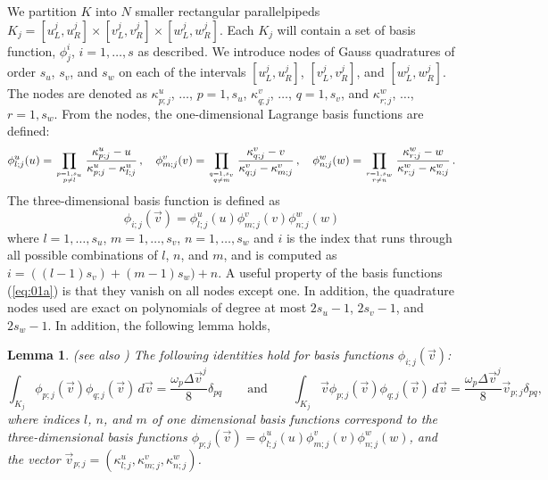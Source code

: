 \documentclass[12pt]{CSUNthesis}
\newtheorem{lemma}{Lemma}
\begin{document}
We partition $K$ into $N$ smaller rectangular parallelpipeds $K_j = [u_L^j, u_R^j] \times [v_L^j, v_R^j] \times [w_L^j, w_R^j]$. Each $K_j$ will contain a set of basis function, $\phi_j^i$, $i=1,\dots, s$ as described. We introduce nodes of Gauss quadratures of order $s_u$, $s_v$, and $s_w$ on each of the intervals $[u_L^j,u_R^j]$, $[v_L^j,v_R^j]$, and $[w_L^j,w_R^j]$. The nodes are denoted as
$\kappa^{u}_{p;j}$, $\dots$, $p=1,s_{u}$,
$\kappa^{v}_{q;j}$, $\dots$, $q=1,s_{v}$, and 
$\kappa^{w}_{r;j}$, $\dots$, $r=1,s_{w}$. From the nodes, the one-dimensional Lagrange basis functions are defined:
\begin{equation}
\label{eq:01}
\phi^{u}_{l;j}(u)=\prod_{{p=1,s_{u}} \atop {p\neq l}} \frac{\kappa^{u}_{p;j}-u}{\kappa^{u}_{p;j}-\kappa^{u}_{l;j}}\, ,\quad 
\phi^{v}_{m;j}(v)=\prod_{{q=1,s_{v}} \atop {q\neq m}} \frac{\kappa^{v}_{q;j}-v}{\kappa^{v}_{q;j}-\kappa^{v}_{m;j}}\, ,\quad 
\phi^{w}_{n;j}(w)=\prod_{{r=1,s_{w}} \atop {r\neq n}} \frac{\kappa^{w}_{r;j}-w}{\kappa^{w}_{r;j}-\kappa^{w}_{n;j}}\, .
\end{equation}
The three-dimensional basis function is defined as
\begin{equation}
\label{eq:01a}
\phi_{i;j}(\vec{v})=\phi^{u}_{l;j}(u)\phi^{v}_{m;j}(v)
\phi^{w}_{n;j}(w)
\end{equation} 
where $l=1, \dots , s_u$, 
$m=1,\dots ,s_v$, 
$n=1,\dots ,s_w$ and $i$ 
is the index that runs through all possible combinations of $l$, $n$, and $m$, and is computed as $i=((l-1)s_v)+(m-1)s_w)+n$.  
A useful property of the basis functions (\ref{eq:01a}) is that they vanish on all nodes except one. In addition, the quadrature nodes used are exact on polynomials of degree at most $2s_u-1$, $2s_v-1$, and $2s_w-1$. In addition, the following lemma holds,
\begin{lemma} (see also \cite{AlekseenkoJosyula2012a, HesthavenWarburtoin2007})
The following identities hold for basis functions $\phi_{i;j}(\vec{v})$:
\begin{equation}
\label{eq:lemma2.1} 
\int_{K_{j}} \phi_{p;j}(\vec{v})\phi_{q;j}(\vec{v})\, d\vec{v} = \frac{\omega_{p}\Delta\vec{v}^{j}}{8}\delta_{pq}
\qquad\mbox{and} \qquad
\int_{K_{j}} \vec{v}\phi_{p;j}(\vec{v})\phi_{q;j}(\vec{v})\, d\vec{v} 
= \frac{\omega_{p}\Delta\vec{v}^{j}}{8}\vec{v}_{p;j}\delta_{pq},
\end{equation}
where indices $l$, $n$, and $m$ of one dimensional basis functions correspond to 
the three-dimensional basis functions 
$\phi_{p;j}(\vec{v})=
\phi^{u}_{l;j}(u)\phi^{v}_{m;j}(v)\phi^{w}_{n;j}(w)$, 
and the vector $\vec{v}_{p;j}=(\kappa^{u}_{l;j},\kappa^{v}_{m;j},\kappa^{w}_{n;j})$. 
\end{lemma}
\end{document}
